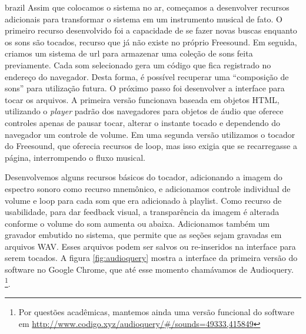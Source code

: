 \begin{otherlanguage*}{brazil}
 Assim que colocamos o sistema no ar, começamos a desenvolver recursos adicionais para transformar o sistema em um instrumento musical de fato. O primeiro recurso desenvolvido foi a capacidade de se fazer novas buscas enquanto os sons são tocados, recurso que já não existe no próprio Freesound. Em seguida, criamos um sistema de url para armazenar uma coleção de sons feita previamente. Cada som selecionado gera um código que fica registrado no endereço do navegador. Desta forma, é possível recuperar uma ``composição de sons'' para utilização futura. O próximo passo foi desenvolver a interface para tocar os arquivos. A primeira versão funcionava baseada em objetos HTML, utilizando o \emph{player} padrão dos navegadores para objetos de áudio que oferece controles apenas de pausar tocar, alterar o instante tocado e dependendo do navegador um controle de volume. Em uma segunda versão utilizamos o tocador do Freesound, que oferecia recursos de loop, mas isso exigia que se recarregasse a página, interrompendo o fluxo musical. 

 Desenvolvemos alguns recursos básicos do tocador, adicionando a imagem do espectro sonoro como recurso mnemônico, e adicionamos controle individual de volume e loop para cada som que era adicionado à playlist. Como recurso de usabilidade, para dar feedback visual, a transparência da imagem é alterada conforme o volume do som aumenta ou abaixa. Adicionamos também um gravador embutido no sistema, que permite que as seções sejam gravadas em arquivos WAV. Esses arquivos podem ser salvos ou re-inseridos na interface para serem tocados. A figura \ref{fig:audioquery} mostra a interface da primeira versão do software no Google Chrome, que até esse momento chamávamos de Audioquery. \footnote{Por questões acadêmicas, mantemos ainda uma versão funcional do software em \url{http://www.codigo.xyz/audioquery/#/sounds=49333,415849}}.


\end{otherlanguage*}
